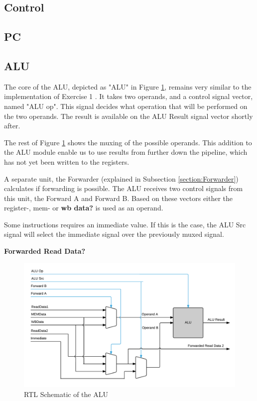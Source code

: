 \subsection{Control}

\subsection{PC}

\subsection{ALU}
The core of the ALU, depicted as "ALU" in Figure \ref{fig:ALU}, remains very similar to the implementation of Exercise 1 \cite{ex1report}. It takes two operands, and a control signal vector, named "ALU op". This signal decides what operation that will be performed on the two operands. The result is available on the ALU Result signal vector shortly after.

The rest of Figure \ref{fig:ALU} shows the muxing of the possible operands. This addition to the ALU module enable us to use results from further down the pipeline, which has not yet been written to the registers.

A separate unit, the Forwarder (explained in Subsection \ref{section:Forwarder}) calculates if forwarding is possible. The ALU receives two control signals from this unit, the Forward A and Forward B.
Based on these vectors either the register-, mem- or \textbf{wb data?} is used as an operand.

Some instructions requires an immediate value. If this is the case, the ALU Src signal will select the immediate signal over the previously muxed signal.

\textbf{Forwarded Read Data?}


\begin{figure}[h!]
    \includegraphics[width=\linewidth]{img/ALU.png}
    \caption{RTL Schematic of the ALU}
    \label{fig:ALU}
\end{figure}

